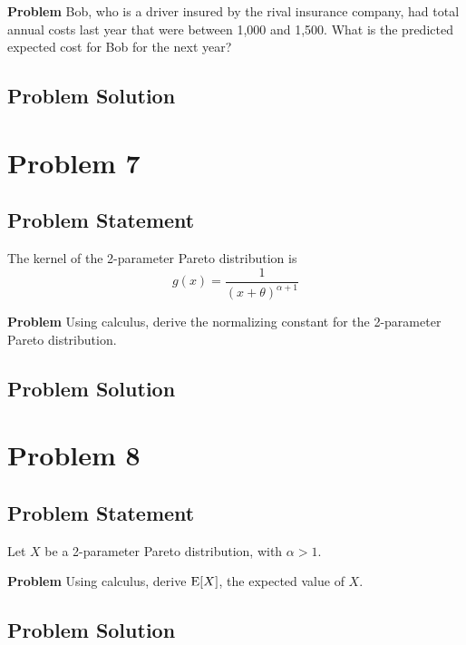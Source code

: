 \documentclass[12pt]{article}
\theoremstyle{definition}
\begin{document}
\bigskip
\noindent
{\bf Problem} Bob, who is a driver insured by the rival insurance company, had total annual costs last year that were between 1,000 and 1,500. What is the predicted expected cost for Bob for the next year?


\subsection*{Problem Solution}




\newpage
\section*{Problem 7}

\subsection*{Problem Statement}

The kernel of the 2-parameter Pareto distribution is
$$
g(x) = \frac{1}{(x + \theta)^{\alpha + 1}}
$$

\bigskip
\noindent
{\bf Problem} Using calculus, derive the normalizing constant for the 2-parameter Pareto distribution.


\subsection*{Problem Solution}




\newpage
\section*{Problem 8}

\subsection*{Problem Statement}

Let $X$ be a 2-parameter Pareto distribution, with $\alpha > 1$.

\bigskip
\noindent
{\bf Problem} Using calculus, derive $\hbox{E}[X]$, the expected value of $X$.


\subsection*{Problem Solution}
\end{document}
